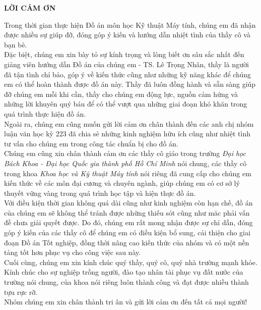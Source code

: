 \begin{center}
    \textbf{LỜI CẢM ƠN}
\end{center}

Trong thời gian thực hiện Đồ án môn học Kỹ thuật Máy tính, chúng em đã nhận được nhiều sự giúp đỡ, đóng góp ý kiến và hướng dẫn nhiệt tình của thầy cô và bạn bè.\\

Đặc biệt, chúng em xin bày tỏ sự kính trọng và lòng biết ơn sâu sắc nhất đến giảng viên hướng dẫn Đồ án của chúng em - TS. Lê Trọng Nhân, thầy là người đã tận tình chỉ bảo, góp ý về kiến thức cũng như những kỹ năng khác để chúng em có thể hoàn thành được đồ án này. Thầy đã luôn đồng hành và sẵn sàng giúp đỡ chúng em mỗi khi cần, thầy cho chúng em động lực, nguồn cảm hứng và những lời khuyên quý báu để có thể vượt qua những giai đoạn khó khăn trong quá trình thực hiện đồ án.\\

Ngoài ra, chúng em cũng muốn gửi lời cảm ơn chân thành đến các anh chị nhóm luận văn học kỳ 223 đã chia sẻ những kinh nghiệm hữu ích cũng như nhiệt tình tư vấn cho chúng em trong công tác chuẩn bị cho đồ án.\\

Chúng em cũng xin chân thành cảm ơn các thầy cô giáo trong trường \textit{Đại học Bách Khoa - Đại học Quốc gia thành phố Hồ Chí Minh} nói chung, các thầy cô trong khoa \textit{Khoa học và Kỹ thuật Máy tính} nói riêng đã cung cấp cho chúng em kiến thức về các môn đại cương và chuyên ngành, giúp chúng em có cơ sở lý thuyết vững vàng trong quá trình học tập và hiện thực đồ án.\\

Với điều kiện thời gian không quá dài cũng như kinh nghiệm còn hạn chế, đồ án của chúng em sẽ không thể tránh được những thiếu sót cũng như măc phải vấn đề chưa giải quyết được. Do đó, chúng em rất mong nhận được sự chỉ dẫn, đóng góp ý kiến của các thầy cô để chúng em có điều kiện bổ sung, cải thiện cho giai đoạn Đồ án Tốt nghiệp, đồng thời nâng cao kiến thức của nhóm và có một nền tảng tốt hơn phục vụ cho công việc sau này.\\

Cuối cùng, chúng em xin kính chúc quý thầy, quý cô, quý nhà trường mạnh khỏe. Kính chúc cho sự nghiệp trồng người, đào tạo nhân tài phục vụ đất nước của trường nói chung, của khoa nói riêng luôn thành công và đạt được nhiều thành tựu rực rỡ.\\ 

Nhóm chúng em xin chân thành tri ân và gửi lời cảm ơn đến tất cả mọi người!


